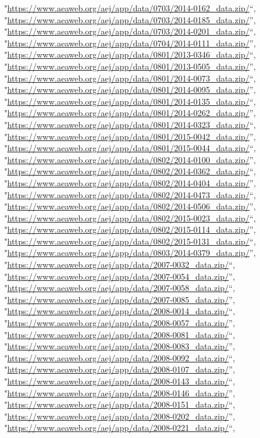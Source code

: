 \documentclass[]{article}
\begin{document}
\begin{itemize}
  "\url{https://www.aeaweb.org/aej/app/data/0703/2014-0162_data.zip/}``,
  "\url{https://www.aeaweb.org/aej/app/data/0703/2014-0185_data.zip/}'',
  "\url{https://www.aeaweb.org/aej/app/data/0703/2014-0201_data.zip/}``,
  "\url{https://www.aeaweb.org/aej/app/data/0704/2014-0111_data.zip/}'',
  "\url{https://www.aeaweb.org/aej/app/data/0801/2013-0346_data.zip/}``,
  "\url{https://www.aeaweb.org/aej/app/data/0801/2013-0505_data.zip/}'',
  "\url{https://www.aeaweb.org/aej/app/data/0801/2014-0073_data.zip/}``,
  "\url{https://www.aeaweb.org/aej/app/data/0801/2014-0095_data.zip/}'',
  "\url{https://www.aeaweb.org/aej/app/data/0801/2014-0135_data.zip/}``,
  "\url{https://www.aeaweb.org/aej/app/data/0801/2014-0262_data.zip/}'',
  "\url{https://www.aeaweb.org/aej/app/data/0801/2014-0323_data.zip/}``,
  "\url{https://www.aeaweb.org/aej/app/data/0801/2015-0042_data.zip/}'',
  "\url{https://www.aeaweb.org/aej/app/data/0801/2015-0044_data.zip/}``,
  "\url{https://www.aeaweb.org/aej/app/data/0802/2014-0100_data.zip/}'',
  "\url{https://www.aeaweb.org/aej/app/data/0802/2014-0362_data.zip/}``,
  "\url{https://www.aeaweb.org/aej/app/data/0802/2014-0404_data.zip/}'',
  "\url{https://www.aeaweb.org/aej/app/data/0802/2014-0473_data.zip/}``,
  "\url{https://www.aeaweb.org/aej/app/data/0802/2014-0506_data.zip/}'',
  "\url{https://www.aeaweb.org/aej/app/data/0802/2015-0023_data.zip/}``,
  "\url{https://www.aeaweb.org/aej/app/data/0802/2015-0114_data.zip/}'',
  "\url{https://www.aeaweb.org/aej/app/data/0802/2015-0131_data.zip/}``,
  "\url{https://www.aeaweb.org/aej/app/data/0803/2014-0379_data.zip/}'',
  "\url{https://www.aeaweb.org/aej/app/data/2007-0032_data.zip/}``,
  "\url{https://www.aeaweb.org/aej/app/data/2007-0054_data.zip/}'',
  "\url{https://www.aeaweb.org/aej/app/data/2007-0058_data.zip/}``,
  "\url{https://www.aeaweb.org/aej/app/data/2007-0085_data.zip/}'',
  "\url{https://www.aeaweb.org/aej/app/data/2008-0014_data.zip/}``,
  "\url{https://www.aeaweb.org/aej/app/data/2008-0057_data.zip/}'',
  "\url{https://www.aeaweb.org/aej/app/data/2008-0081_data.zip/}``,
  "\url{https://www.aeaweb.org/aej/app/data/2008-0083_data.zip/}'',
  "\url{https://www.aeaweb.org/aej/app/data/2008-0092_data.zip/}``,
  "\url{https://www.aeaweb.org/aej/app/data/2008-0107_data.zip/}'',
  "\url{https://www.aeaweb.org/aej/app/data/2008-0143_data.zip/}``,
  "\url{https://www.aeaweb.org/aej/app/data/2008-0146_data.zip/}'',
  "\url{https://www.aeaweb.org/aej/app/data/2008-0151_data.zip/}``,
  "\url{https://www.aeaweb.org/aej/app/data/2008-0202_data.zip/}'',
  "\url{https://www.aeaweb.org/aej/app/data/2008-0221_data.zip/}``,

\end{itemize}
\end{document}
